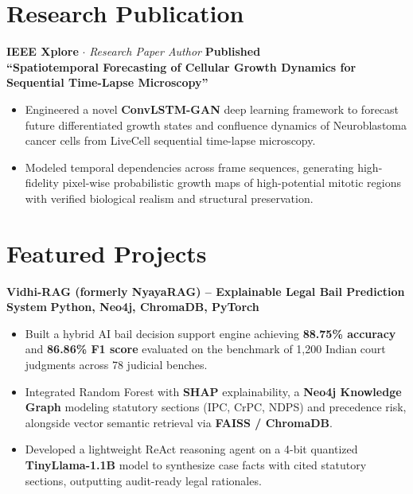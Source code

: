\documentclass[10pt,a4paper]{article}
\begin{document}
\section{Research Publication}
\noindent
\textbf{IEEE Xplore} $\cdot$ \textit{Research Paper Author} \hfill \textbf{Published} \\
\textbf{``Spatiotemporal Forecasting of Cellular Growth Dynamics for Sequential Time-Lapse Microscopy''}
\begin{itemize}
  \item Engineered a novel \textbf{ConvLSTM-GAN} deep learning framework to forecast future differentiated growth states and confluence dynamics of Neuroblastoma cancer cells from LiveCell sequential time-lapse microscopy.
  \item Modeled temporal dependencies across frame sequences, generating high-fidelity pixel-wise probabilistic growth maps of high-potential mitotic regions with verified biological realism and structural preservation.
\end{itemize}
\vspace{-3pt}

\section{Featured Projects}

\noindent
\textbf{Vidhi-RAG (formerly NyayaRAG) -- Explainable Legal Bail Prediction System} \hfill \textbf{Python, Neo4j, ChromaDB, PyTorch}
\begin{itemize}
  \item Built a hybrid AI bail decision support engine achieving \textbf{88.75\% accuracy} and \textbf{86.86\% F1 score} evaluated on the benchmark of 1,200 Indian court judgments across 78 judicial benches.
  \item Integrated Random Forest with \textbf{SHAP} explainability, a \textbf{Neo4j Knowledge Graph} modeling statutory sections (IPC, CrPC, NDPS) and precedence risk, alongside vector semantic retrieval via \textbf{FAISS / ChromaDB}.
  \item Developed a lightweight ReAct reasoning agent on a 4-bit quantized \textbf{TinyLlama-1.1B} model to synthesize case facts with cited statutory sections, outputting audit-ready legal rationales.
\end{itemize}
\end{document}
